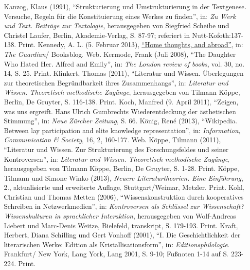 \documentclass[fontsize=12pt]{scrartcl}
\begin{document}
{{{{\begin{thebibliography}
	Kanzog, Klaus (1991), "`Strukturierung und Umstrukturierung in der Textgenese. Versuche, Regeln f\"ur die Konstituierung eines Werkes zu finden"', in: \textit{Zu Werk und Text. Beitr\"age zur Textologie}, he\-rausgegeben von Siegfried Scheibe und Christel Laufer, Berlin, Akademie-Verlag, S. 87-97; referiert in Nutt-Kofoth:137-138. Print.
	Kennedy, A. L. (5. Februar 2013), \href{http://www.theguardian.com/books/booksblog/2013/feb/05/al-kennedy-home-thoughts-creative-writing}{"`Home thoughts, and abroad"'}, in: \textit{The Guardian}/ Booksblog. Web. 
	Kermode, Frank (Juli 2008), "`The Daughter Who Hated Her. Alfred and Emily"', in: \textit{The London review of books}, vol. 30, no. 14, S. 25. Print.
	Klinkert, Thomas (2011), "`Li\-te\-ra\-tur und Wissen. \"Uberlegungen zur theo\-retischen Begr\"undbarkeit ihres Zusammenhangs"', in: \textit{Li\-te\-ra\-tur und Wissen. Theo\-retisch-me\-tho\-di\-sche Zug\"ange}, he\-rausgegeben von Tilmann K\"oppe, Berlin, De Gruyter, S. 116-138. Print.
	Koch, Manfred (9. April 2011), "`Zeigen, was uns ergreift. Hans Ulrich Gumbrechts Wiederentdeckung der \"asthetischen Stimmung"', in: \textit{Neue Z\"urcher Zeitung}, S. 66.
	K\"onig, Ren\'{e} (2013), "`Wi\-ki\-pe\-dia. Between lay participation and elite know\-ledge representation"', in: \textit{Information, Communication \& Society}, \href{http://www.tandfonline.com/toc/rics20/16/2}{16, 2}, 160-177. Web.
	K\"oppe, Tilmann (2011), "`Li\-te\-ra\-tur und Wissen. Zur Strukturierung des For\-\-schungs\-fel\-des und seiner Kontroversen"', in: \textit{Li\-te\-ra\-tur und Wissen. Theo\-retisch-methodische Zug\"ange}, he\-rausgegeben von Tilmann K\"oppe, Berlin, De Gruyter, S. 1-28. Print.
	K\"oppe, Tilmann und Simone Winko (2013), \textit{Neuere Li\-te\-ra\-tur\-theorien. Eine Einf\"uh\-rung}, 2., aktualisierte und erweiterte Auflage, Stuttgart/Weimar, Metzler. Print.
	Kohl, Christian und Thomas Metten (2006), "`Wissenskonstruktion durch kooperatives Schrei\-ben in Netz\-werkmedien"', in: \textit{Kontroversen als Schl\"ussel zur Wissenschaft? Wissenskulturen in sprachlicher Interaktion}, he\-rausgegeben von Wolf-Andre\-as Lie\-bert und Marc-Denis Weitze, Bielefeld, transkript, S. 179-193. Print.
	Kraft, Herbert, Diana Schilling und Gert Vonhoff (2001), "`I. Die Geschichtlichkeit der li\-te\-ra\-rischen Werke: Edition als Kristallisationsform"', in: \textit{Editionsphilologie}. Frankfurt/ New York, Lang York, Lang 2001, S. 9-10; Fu{\ss}noten 1-14 auf S. 223-224. Print.

\end{thebibliography}}}}}
\end{document}
